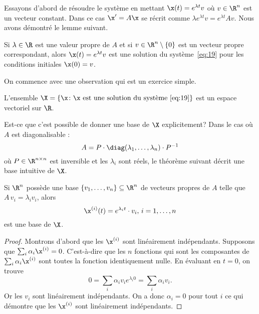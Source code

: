 {\scriptsize   \color{lightgray}

\noindent   
  Essayons d'abord de résoudre le système en mettant  $\x(t) = e^{\lambda t} v$ où $v \in \R^n$ est un vecteur constant. Dans ce cas $\x' = A\x$ se récrit comme   $\lambda e^{\lambda t}  v = e^{\lambda t} A v$. Nous avons démontré le lemme suivant.  

\begin{lemma}
  \label{thr:29}
  Si $\lambda \in \R$ est une valeur propre de $A$ et si $v \in \R^n \setminus \{0\}$ est un vecteur propre correspondant, alors $\x(t) = e^{\lambda t} v$ est  une solution du système~\eqref{eq:19} pour les conditions initiales $\x(0) = v$. 
\end{lemma}


 On commence avec une observation qui est un exercice simple. 

\begin{lemma}
  \label{lem:13}
  L'ensemble $\X = \{ \x \colon \x \text{ est une solution du système \eqref{eq:19}}\}$ est un espace vectoriel sur $\R$.  
\end{lemma}

Est-ce que c'est possible de donner  une base de $\X$ explicitement? Dans le cas où $A$ est diagonalisable : 
\begin{displaymath}
  A = P \cdot \diag(\lambda_1,\dots,\lambda_n) \cdot P^{-1} 
\end{displaymath}
où $P \in \R^{n \times n}$ est inversible et les  $\lambda_i$ sont réels, le théorème suivant décrit une base intuitive de $\X$.

\begin{theorem}
  \label{thr:30}
  Si $\R^n$ possède une base $\{v_1,\dots,v_n\} \subseteq \R^n$ de vecteurs propres de $A$ telle que $A \, v_i = \lambda_i v_i$, alors  
  \begin{displaymath}
    \x^{(i)}(t) = e^{\lambda_i t} \cdot v_i, \, i=1,\dots,n
  \end{displaymath}
est une base de $\X$. 
\end{theorem}

\begin{proof}
  Montrons d'abord que les $\x^{(i)}$ sont linéairement indépendants. Supposons que $\sum_{i} \alpha_i \x^{(i)} = 0$. C'est-à-dire que les $n$ fonctions qui sont les composantes de $\sum_{i} \alpha_i \x^{(i)}$ sont toutes la fonction identiquement nulle. En évaluant en $t=0$, on trouve
  \begin{displaymath}
    0 = \sum_i \alpha_i v_i e^{\lambda_i 0} = \sum_i \alpha_i v_i.  
  \end{displaymath}
Or les $v_i$ sont linéairement indépendants. On a donc $\alpha_i = 0$ pour tout $i$ ce qui démontre que les $\x^{(i)}$ sont linéairement indépendants. 



\end{proof}}
